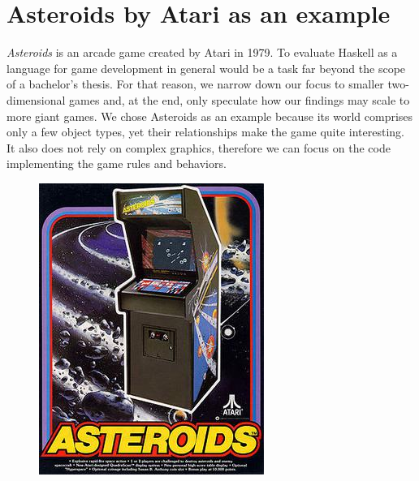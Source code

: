 \documentclass[
  digital, %
  color,   %
  table,   %
  oneside, %
  lof,     %
  lot,     %
]{fithesis3}
\begin{document}
\section{Asteroids by Atari as an example}
\label{sect:whyasteroids}
\emph{Asteroids} is an arcade game created by Atari in 1979.
To evaluate Haskell as a language for game development in general
would be a task far beyond the scope of a bachelor's thesis. For that reason,
we narrow down our focus to smaller two-dimensional games and, at the end,
only speculate how our findings may scale to more giant games.
We chose Asteroids as an example because its world comprises only
a few object types, yet their relationships make the game quite interesting.
It also does not rely on complex graphics, therefore we can focus
on the code implementing the game rules and behaviors.
\begin{figure}[H]
    \begin{minipage}{0.33\textwidth}
        \includegraphics[height=1.3\textwidth]{images/Asteroids-arcadegame.jpg}\hfill

\end{minipage}
\end{figure}
\end{document}
